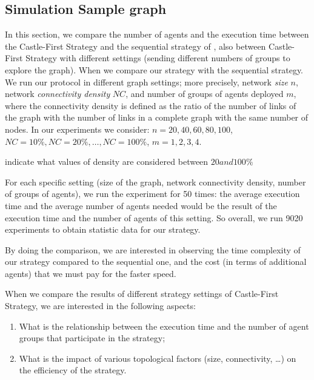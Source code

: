 \subsection{Simulation Sample graph} 
In this section, we compare the number of agents and the execution time between the {\sc Castle-First} Strategy and the sequential strategy of \cite{cai}, also between {\sc Castle-First} Strategy with different settings (sending different numbers of groups to explore the graph). When we compare our strategy with the sequential strategy.
We run our protocol in different graph settings; more precisely, network {\em size} $n$,  network {\em connectivity density} $NC$, and number of groups of agents deployed $m$, where the  connectivity density is defined as the ratio of the number of links of the graph with   the number of links in a complete graph with the same  number of nodes.
In our experiments we consider: $n=20,40,60,80,100$,     
$NC= 10\%, NC=20\%, \ldots, NC=100\% $, $m=1,2,3,4$. 

\color{blue} indicate what values of density are considered between $20 and 100\%$
\color{black}

For each specific setting (size of the graph,   network connectivity density,    number of groups of agents), we run the experiment for 50 times: the average execution time and the average number of agents needed would be the result of the execution time and the number of agents of this setting. So overall, we run 9020 experiments to obtain statistic data for our strategy.

By doing the comparison, we are interested in observing 
the time complexity of  our strategy   compared to the sequential one, and 
  the cost (in terms of additional agents) that we must pay for the faster speed.  

When we compare the results of different strategy settings of {\sc Castle-First} Strategy, we are interested in the following aspects: 
\begin{enumerate}
\item What is the relationship between the execution time and the number of agent groups that  participate in the strategy;
\item 
What is the impact of various topological factors (size,  connectivity, \ldots) on the efficiency of the strategy.
\end{enumerate}


